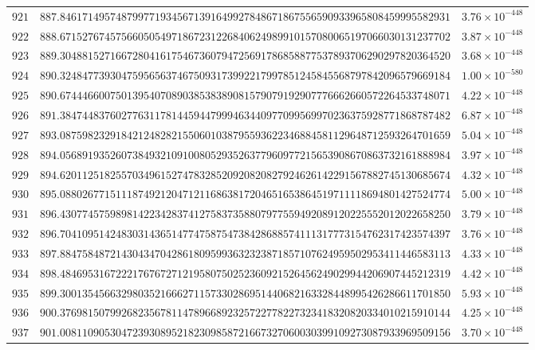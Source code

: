 \documentclass[12pt,reqno]{amsart}
\theoremstyle{remark}
\begin{document}
\begin{longtable}{clc}
$921$ & $887.8461714957487997719345671391649927848671867556590933965808459995582931$ & $3.76\times 10^{-448}$ \\
$922$ & $888.6715276745756605054971867231226840624989910157080065197066030131237702$ & $3.87\times 10^{-448}$ \\
$923$ & $889.3048815271667280416175467360794725691786858877537893706290297820364520$ & $3.68\times 10^{-448}$ \\
$924$ & $890.3248477393047595656374675093173992217997851245845568797842096579669184$ & $1.00\times 10^{-580}$ \\
$925$ & $890.6744466007501395407089038538389081579079192907776662660572264533748071$ & $4.22\times 10^{-448}$ \\
$926$ & $891.3847448376027763117814459447999463440977099569970236375928771868787482$ & $6.87\times 10^{-448}$ \\
$927$ & $893.0875982329184212482821550601038795593622346884581129648712593264701659$ & $5.04\times 10^{-448}$ \\
$928$ & $894.0568919352607384932109100805293526377960977215653908670863732161888984$ & $3.97\times 10^{-448}$ \\
$929$ & $894.6201125182557034961527478328520920820827924626142291567882745130685674$ & $4.32\times 10^{-448}$ \\
$930$ & $895.0880267715111874921204712116863817204651653864519711118694801427524774$ & $5.00\times 10^{-448}$ \\
$931$ & $896.4307745759898142234283741275837358807977559492089120225552012022658250$ & $3.79\times 10^{-448}$ \\
$932$ & $896.7041095142483031436514774758754738428688574111317773154762317423574397$ & $3.76\times 10^{-448}$ \\
$933$ & $897.8847584872143043470428618095993632323871857107624959502953411446583113$ & $4.33\times 10^{-448}$ \\
$934$ & $898.4846953167222176767271219580750252360921526456249029944206907445212319$ & $4.42\times 10^{-448}$ \\
$935$ & $899.3001354566329803521666271157330286951440682163328448995426286611701850$ & $5.93\times 10^{-448}$ \\
$936$ & $900.3769815079926823567811478966892325722778227323418320820334010215910144$ & $4.25\times 10^{-448}$ \\
$937$ & $901.0081109053047239308952182309858721667327060030399109273087933969509156$ & $3.70\times 10^{-448}$ \\

\end{longtable}
\end{document}
